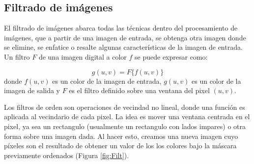 
	




\subsection{Filtrado  de im\'agenes}
El filtrado de im\'agenes abarca todas las t\'ecnicas dentro del procesamiento de im\'agenes, que a partir de una imagen de entrada, se obtenga otra imagen donde se elimine, se enfatice o resalte algunas caracter\'isticas de la imagen de entrada. 
Un filtro $F$ de una imagen digital a color $f$ se puede expresar como:

\begin{equation}
\label{Filtrado} 
      g(u,v) = F\{f(u,v)\}
\end{equation}
donde $f(u,v)$ es un color de la imagen de entrada, $g(u,v)$ es un color de la imagen de salida y $F$ es el filtro definido sobre una ventana del pixel $(u,v)$.


Los filtros de orden son operaciones de vecindad no lineal, donde una funci\'on es aplicada al vecindario de cada pixel. La idea es mover una ventana centrada en el pixel, ya sea un rectangulo (usualmente un rectangulo con lados impares) o otra forma sobre una imagen dada. Al hacer esto, creamos una nueva imagen cuyo p\'ixeles son el resultado de obtener un valor de los los colores bajo la m\'ascara previamente ordenados (Figura \ref{fig:Filt}). 


